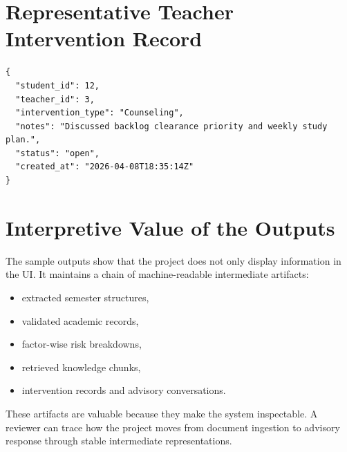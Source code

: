 \section{Representative Teacher Intervention Record}
\begin{lstlisting}[style=sarscode,caption={Illustrative Stored Intervention Entry}]
{
  "student_id": 12,
  "teacher_id": 3,
  "intervention_type": "Counseling",
  "notes": "Discussed backlog clearance priority and weekly study plan.",
  "status": "open",
  "created_at": "2026-04-08T18:35:14Z"
}
\end{lstlisting}

\section{Interpretive Value of the Outputs}
The sample outputs show that the project does not only display information in the UI. It maintains a chain of machine-readable intermediate artifacts:
\begin{itemize}[leftmargin=*]
\item extracted semester structures,
\item validated academic records,
\item factor-wise risk breakdowns,
\item retrieved knowledge chunks,
\item intervention records and advisory conversations.
\end{itemize}

These artifacts are valuable because they make the system inspectable. A reviewer can trace how the project moves from document ingestion to advisory response through stable intermediate representations.
